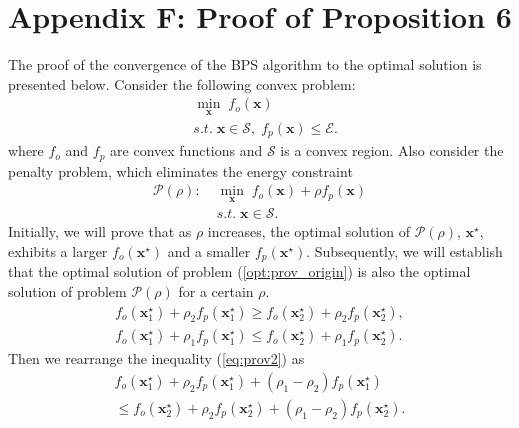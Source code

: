 \section*{Appendix F: Proof of Proposition 6}
\label{app:prop6}
The proof of the convergence of the BPS algorithm to the optimal solution is presented below. Consider the following convex problem:
\begin{equation}
\label{opt:prov_origin}
\begin{aligned}
    &\underset{\mathbf{x}}{\min} \;
    f_o(\mathbf{x}) \\
    &s.t.\; \mathbf{x}\in\mathcal{S},\; f_p(\mathbf{x})\leq\mathcal{E}.
\end{aligned}
\end{equation}
where $f_o$ and $f_p$ are convex functions and $\mathcal{S}$ is a convex region.
Also consider the penalty problem, which eliminates the energy constraint
\begin{equation}
\label{opt:prov_penalty}
\begin{aligned}
    \mathcal{P}(\rho):\; &\underset{\mathbf{x}}{\min} \;
    f_o(\mathbf{x})+\rho f_p(\mathbf{x}) \\
    &s.t.\; \mathbf{x}\in\mathcal{S}.
\end{aligned}
\end{equation}
Initially, we will prove that as $\rho$ increases, the optimal solution of $\mathcal{P}(\rho)$, $\mathbf{x}^{\star}$, exhibits a larger $f_o(\mathbf{x}^{\star})$ and a smaller $f_p(\mathbf{x}^{\star})$. Subsequently, we will establish that the optimal solution of problem (\ref{opt:prov_origin}) is also the optimal solution of problem $\mathcal{P}(\rho)$ for a certain $\rho$.
\begin{align}
    f_o(\mathbf{x}_1^{\star})+\rho_2f_p(\mathbf{x}_1^{\star})\geq f_o(\mathbf{x}_2^{\star})+\rho_2f_p(\mathbf{x}_2^{\star}), \label{eq:prov1}\\
    f_o(\mathbf{x}_1^{\star})+\rho_1f_p(\mathbf{x}_1^{\star})\leq f_o(\mathbf{x}_2^{\star})+\rho_1f_p(\mathbf{x}_2^{\star}). \label{eq:prov2}
\end{align}
Then we rearrange the inequality (\ref{eq:prov2}) as
\begin{equation}
\label{eq:prov3}
\begin{aligned}
    f_o(\mathbf{x}_1^{\star})+\rho_2f_p(\mathbf{x}_1^{\star})+(\rho_1-\rho_2)f_p(\mathbf{x}_1^{\star}) \\ \leq f_o(\mathbf{x}_2^{\star})+\rho_2f_p(\mathbf{x}_2^{\star})+(\rho_1-\rho_2)f_p(\mathbf{x}_2^{\star}).
\end{aligned}
\end{equation}
